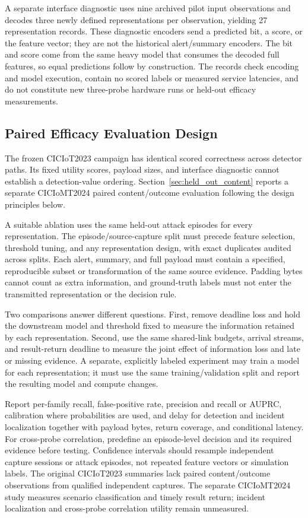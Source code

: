 \documentclass[10pt,onecolumn]{IEEEtran}
\begin{document}
A separate interface diagnostic uses nine archived pilot input observations
and decodes three newly defined representations per observation, yielding
27 representation records. These diagnostic encoders send a predicted bit,
a score, or the feature vector; they are not the historical alert/summary
encoders. The bit and score come from the same heavy model that consumes the
decoded full features, so equal predictions follow by construction. The
records check encoding and model execution, contain no scored labels or
measured service latencies, and do not constitute new three-probe hardware
runs or held-out efficacy measurements.

\subsection{Paired Efficacy Evaluation Design}
The frozen CICIoT2023 campaign has identical scored correctness across detector
paths. Its fixed utility scores, payload sizes, and interface diagnostic cannot
establish a detection-value ordering. Section~\ref{sec:held_out_content}
reports a separate CICIoMT2024 paired content/outcome evaluation following
the design principles below.

A suitable ablation uses the same held-out attack episodes for every
representation. The episode/source-capture split must precede feature
selection, threshold tuning, and any representation design, with exact
duplicates audited across splits. Each alert, summary, and full payload must
contain a specified, reproducible subset or transformation of the same source
evidence. Padding bytes cannot count as extra information, and ground-truth
labels must not enter the transmitted representation or the decision rule.

Two comparisons answer different questions. First, remove deadline loss and
hold the downstream model and threshold fixed to measure the information
retained by each representation. Second, use the same shared-link budgets,
arrival streams, and result-return deadline to measure the joint effect of
information loss and late or missing evidence. A separate, explicitly labeled
experiment may train a model for each representation; it must use the same
training/validation split and report the resulting model and compute changes.

Report per-family recall, false-positive rate, precision and recall or AUPRC,
calibration where probabilities are used, and delay for detection and
incident localization together with payload bytes, return coverage, and
conditional latency.
For cross-probe correlation, predefine an episode-level decision and its
required evidence before testing. Confidence intervals should resample
independent capture sessions or attack episodes, not repeated feature vectors
or simulation labels. The original CICIoT2023 summaries lack paired
content/outcome observations from qualified independent captures. The separate
CICIoMT2024 study measures scenario classification and timely result return;
incident localization and cross-probe correlation utility remain unmeasured.
\end{document}
